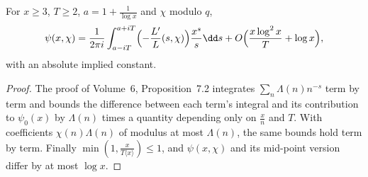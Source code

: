 \begin{lemma}\label{lem:perronchi}
For $x\ge3$, $T\ge2$, $a=1+\frac1{\log x}$ and $\chi$ modulo $q$,
\[
\psi(x,\chi)=\frac1{2\pi i}\int_{a-iT}^{a+iT}\Bigl(-\frac{L'}L(s,\chi)\Bigr)\frac{x^s}s\dd s+O\Bigl(\frac{x\log^2x}T+\log x\Bigr),
\]
with an absolute implied constant.
\end{lemma}
\begin{proof}
The proof of Volume~6, Proposition~7.2 integrates $\sum_n\Lambda(n)n^{-s}$ term by term and bounds the difference between each term's integral and its contribution to $\psi_0(x)$ by $\Lambda(n)$ times a quantity depending only on $\frac xn$ and $T$. With coefficients $\chi(n)\Lambda(n)$ of modulus at most $\Lambda(n)$, the same bounds hold
term by term. Finally $\min(1,\frac x{T\langle x\rangle})\le1$, and $\psi(x,\chi)$ and its mid-point version differ by at most $\log x$.
\end{proof}

